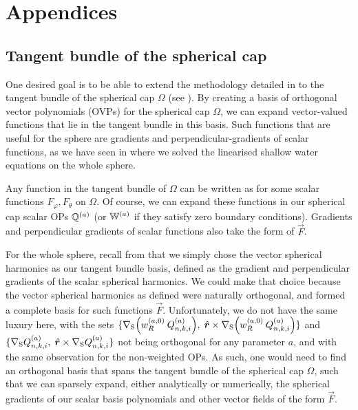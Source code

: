 
\appendix
\chapter*{Appendices}



\renewcommand{\thesection}{A}
\section{Tangent bundle of the spherical cap}\label{appendix:tangent}

One desired goal is to be able to extend the methodology detailed in  to the tangent bundle of the spherical cap $\Omega$ (see ). By creating a basis of orthogonal vector polynomials (OVPs) for the spherical cap $\Omega$, we can expand vector-valued functions that lie in the tangent bundle in this basis. Such functions that are useful for the sphere are gradients and perpendicular-gradients of scalar functions, as we have seen in  where we solved the linearised shallow water equations on the whole sphere.

Any function in the tangent bundle of $\Omega$ can be written as 
for some scalar functions $F_\varphi, F_\theta$ on $\Omega$. Of course, we can expand these functions in our spherical cap scalar OPs ${\mathbb{Q}}^{(a)}$ (or $\mathbb{W}^{(a)}$ if they satisfy zero boundary conditions). Gradients and perpendicular gradients of scalar functions also take the form of $\vec{F}$. 

For the whole sphere, recall from  that we simply chose the vector spherical harmonics as our tangent bundle basis, defined as the gradient and perpendicular gradients of the scalar spherical harmonics. We could make that choice because the vector spherical harmonics as defined were naturally orthogonal, and formed a complete basis for such functions $\vec{F}$. Unfortunately, we do not have the same luxury here, with the sets $\{ \nabla_{\rm S} \Big( w_R^{(a,0)} \: Q_{n,k,i}^{(a)} \Big), \; \hat{\bm{r}} \times \nabla_{\rm S} \Big( w_R^{(a,0)} \: Q_{n,k,i}^{(a)} \Big) \}$ and $\{ \nabla_{\rm S} Q_{n,k,i}^{(a)}, \; \hat{\bm{r}} \times \nabla_{\rm S} Q_{n,k,i}^{(a)} \}$ not being orthogonal for any parameter $a$, and with the same observation for the non-weighted OPs. As such, one would need to find an orthogonal basis that spans the tangent bundle of the spherical cap $\Omega$, such that we can sparsely expand, either analytically or numerically, the spherical gradients of our scalar basis polynomials and other vector fields of the form $\vec{F}$.




